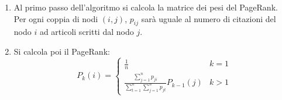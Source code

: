 \documentclass[a4paper, 12pt]{article}
\newcommand{\altroindice}{t}
\begin{document}
\begin{enumerate}
  \item 
  Al primo passo dell'algoritmo si calcola la matrice dei pesi del PageRank. \\
  Per ogni coppia di nodi $ (i, j) $, $ p_{ij} $ sarà uguale al numero di citazioni del nodo $ i $ ad articoli scritti dal nodo $ j $. 
  \item
  Si calcola poi il PageRank: 
  \begin{equation}
  P_k(i) = 
    \begin{cases} 
      \displaystyle \frac{1}{n} & k = 1 \\
      \displaystyle \frac
        {\displaystyle \sum_{j=1}^{n} p_{ji}}
        {\displaystyle \sum_{\altroindice=1}^{n} {\sum_{j=1}^{n} p_{j\altroindice}}}
        P_{k-1}(j) & k > 1 


\end{cases}
\end{equation}
\end{enumerate}
\end{document}
